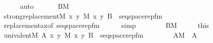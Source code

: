 \begin{isabellebody}
\ \ \ \ \isamarkupfalse%
\ auto\isanewline
\ \ \isamarkupfalse%
\isanewline
\ \ \isamarkupfalse%
\ {\isachardoublequoteopen}B{\isasymin}M{\isachardoublequoteclose}\isanewline
\ \ \isamarkupfalse%
\isanewline
\ \ \isamarkupfalse%
\ {\isachardoublequoteopen}strong{\isacharunderscore}{\kern0pt}replacement{\isacharparenleft}{\kern0pt}{\isacharhash}{\kern0pt}{\isacharhash}{\kern0pt}M{\isacharcomma}{\kern0pt}\ {\isasymlambda}x\ y{\isachardot}{\kern0pt}\ M{\isacharcomma}{\kern0pt}\ {\isacharbrackleft}{\kern0pt}x{\isacharcomma}{\kern0pt}\ y{\isacharcomma}{\kern0pt}\ B{\isacharbrackright}{\kern0pt}\ {\isasymTurnstile}\ seqspace{\isacharunderscore}{\kern0pt}rep{\isacharunderscore}{\kern0pt}fm{\isacharparenleft}{\kern0pt}{}{\isacharcomma}{\kern0pt}\ {}{\isacharcomma}{\kern0pt}\ {}{\isacharparenright}{\kern0pt}{\isacharparenright}{\kern0pt}{\isachardoublequoteclose}\isanewline
\ \ \ \ \isamarkupfalse%
\ replacement{\isacharunderscore}{\kern0pt}ax{\isacharbrackleft}{\kern0pt}of\ {\isachardoublequoteopen}seqspace{\isacharunderscore}{\kern0pt}rep{\isacharunderscore}{\kern0pt}fm{\isacharparenleft}{\kern0pt}{}{\isacharcomma}{\kern0pt}{}{\isacharcomma}{\kern0pt}{}{\isacharparenright}{\kern0pt}{\isachardoublequoteclose}{\isacharbrackright}{\kern0pt}\isanewline
\ \ \ \ \isamarkupfalse%
\ simp\isanewline
\ \ \isamarkupfalse%
\ \isanewline
\ \ \isamarkupfalse%
\ {\isacartoucheopen}B{\isasymin}M{\isacartoucheclose}\isanewline
\ \ \isamarkupfalse%
\ \isamarkupfalse%
\ this\isanewline
\ \ \isamarkupfalse%
\ {\isachardoublequoteopen}univalent{\isacharparenleft}{\kern0pt}{\isacharhash}{\kern0pt}{\isacharhash}{\kern0pt}M{\isacharcomma}{\kern0pt}\ A{\isacharcomma}{\kern0pt}\ {\isasymlambda}x\ y{\isachardot}{\kern0pt}\ M{\isacharcomma}{\kern0pt}\ {\isacharbrackleft}{\kern0pt}x{\isacharcomma}{\kern0pt}\ y{\isacharcomma}{\kern0pt}\ B{\isacharbrackright}{\kern0pt}\ {\isasymTurnstile}\ seqspace{\isacharunderscore}{\kern0pt}rep{\isacharunderscore}{\kern0pt}fm{\isacharparenleft}{\kern0pt}{}{\isacharcomma}{\kern0pt}\ {}{\isacharcomma}{\kern0pt}\ {}{\isacharparenright}{\kern0pt}{\isacharparenright}{\kern0pt}{\isachardoublequoteclose}\ \isanewline
\ \ \ \ \ {\isachardoublequoteopen}A{\isasymin}M{\isachardoublequoteclose}\ \ A\ \isanewline

\end{isabellebody}
